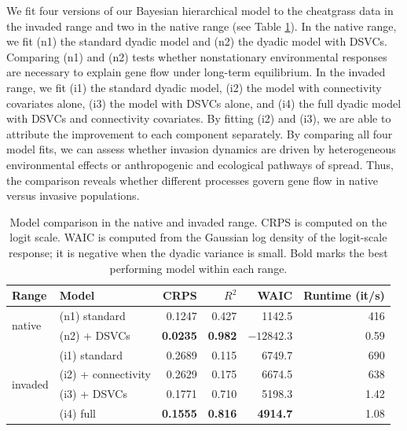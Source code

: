 \documentclass{article}
\begin{document}
We fit four versions of our Bayesian hierarchical model to the cheatgrass data in the invaded range and two in the native range (see Table \ref{tab:t1}). In the native range, we fit (n1) the standard dyadic model and (n2) the dyadic model with DSVCs. Comparing (n1) and (n2) tests whether nonstationary environmental responses are necessary to explain gene flow under long-term equilibrium. 
In the invaded range, we fit (i1) the standard dyadic model, (i2) the model with connectivity covariates alone, (i3) the model with DSVCs alone, and (i4) the full dyadic model with DSVCs and connectivity covariates. 
By fitting (i2) and (i3), we are able to attribute the improvement to each component separately.
By comparing all four model fits, we can assess whether invasion dynamics are driven by heterogeneous environmental effects or anthropogenic and ecological pathways of spread. Thus, the comparison reveals whether different processes govern gene flow in native versus invasive populations.

\begin{table}
\caption{Model comparison in the native and invaded range. CRPS is computed on the logit scale. WAIC is computed from the Gaussian log density of the logit-scale response; it is negative when the dyadic variance is small. Bold marks the best performing model within each range.}
\label{tab:t1}
\begin{tabular}{llrrrr}
\toprule
Range & Model & CRPS & $R^2$ & WAIC & Runtime (it/s) \\
\midrule
\multirow{2}{*}{native} & (n1) standard & 0.1247 & 0.427 & 1142.5 & 416 \\
 & (n2) + DSVCs & \textbf{0.0235} & \textbf{0.982} & $\mathbf{-12842.3}$ & 0.59 \\
\midrule
\multirow{4}{*}{invaded} & (i1) standard & 0.2689 & 0.115 & 6749.7 & 690 \\
 & (i2) + connectivity & 0.2629 & 0.175 & 6674.5 & 638 \\
 & (i3) + DSVCs & 0.1771 & 0.710 & 5198.3 & 1.42 \\
 & (i4) full & \textbf{0.1555} & \textbf{0.816} & \textbf{4914.7} & 1.08 \\
\bottomrule
\end{tabular}
\end{table}
\end{document}
